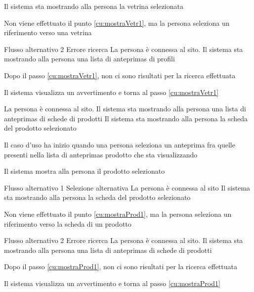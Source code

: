 {Il sistema sta mostrando alla persona la vetrina selezionata}%
{\begin{enumCU}
	\item Non viene effettuato il punto \ref{cu:mostraVetr1}, ma la persona seleziona un \gls{riferimento} verso una vetrina
\end{enumCU}}%
%
%
{Flusso alternativo 2}%
{Errore ricerca}%
{La persona è connessa al sito. Il sistema sta mostrando alla persona una lista di \glspl{anteprima} di profili}%
{\postNulle}%
{\begin{enumCU}
	\item Dopo il passo \ref{cu:mostraVetr1}, non ci sono risultati per la ricerca effettuata
	\item Il sistema visualizza un avvertimento e torna al passo \ref{cu:mostraVetr1}
\end{enumCU}}%


{La persona è connessa al sito. Il sistema sta mostrando alla persona una lista di \glspl{anteprima} di schede di prodotti}
{Il sistema sta mostrando alla persona la scheda del prodotto selezionato}
{\begin{enumCU}
	\item Il caso d'uso ha inizio quando una persona seleziona un \gls{anteprima} fra quelle presenti nella lista di \glspl{anteprima} prodotto che sta visualizzando\label{cu:mostraProd1}
	\item Il sistema mostra alla persona il prodotto selezionato
	\item {}
\end{enumCU}
}
%
{Flusso alternativo 1}%
{Selezione alternativa}%
{La persona è connessa al sito}%
{Il sistema sta mostrando alla persona la scheda del prodotto selezionato}%
{\begin{enumCU}
		\item Non viene effettuato il punto \ref{cu:mostraProd1}, ma la persona seleziona un \gls{riferimento} verso la scheda di un prodotto
\end{enumCU}}%
%
{Flusso alternativo 2}%
{Errore ricerca}%
{La persona è connessa al sito. Il sistema sta mostrando alla persona una lista di \glspl{anteprima} di schede di prodotti}%
{\postNulle}%
{\begin{enumCU}
		\item Dopo il passo \ref{cu:mostraProd1}, non ci sono risultati per la ricerca effettuata
		\item Il sistema visualizza un avvertimento e torna al passo \ref{cu:mostraProd1}
\end{enumCU}}%

